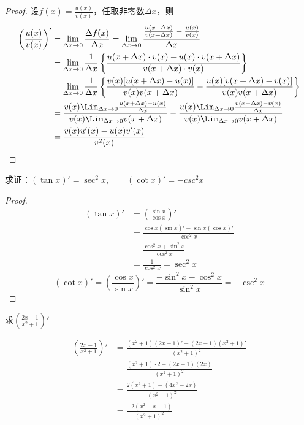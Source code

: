 \begin{proof}
    设$f(x)=\frac{u(x)}{v(x)}$，任取非零数$\Delta x$，则
\begin{align*}
    \left(\frac{u(x)}{v(x)}\right)'&=\lim_{\Delta x\to 0}\frac{\Delta f(x)}{\Delta x}=\lim_{\Delta x\to 0}\frac{\frac{u(x+\Delta x)}{v(x+\Delta x)}-\frac{u(x)}{v(x)}}{\Delta x}\\
    &=\lim_{\Delta x\to 0}\frac{1}{\Delta x}\left\{\frac{u(x+\Delta x)\cdot v(x)-u(x)\cdot v(x+\Delta x)}{v(x+\Delta x)\cdot v(x)}\right\}\\
    &=\lim_{\Delta x\to 0}\frac{1}{\Delta x}\left\{\frac{v(x)[u(x+\Delta x)-u(x)]}{v(x)v(x+\Delta x)}-\frac{u(x)[v(x+\Delta x)-v(x)]}{v(x)v(x+\Delta x)}\right\}\\
    &=\frac{v(x)\Lim_{\Delta x\to 0}\frac{u(x+\Delta x)-u(x)}{\Delta x}}{v(x)\Lim_{\Delta x\to 0}v(x+\Delta x)}-\frac{u(x)\Lim_{\Delta x\to 0}\frac{v(x+\Delta x)-v(x)}{\Delta x}}{v(x)\Lim_{\Delta x\to 0}v(x+\Delta x)}\\
    &=\frac{v(x) u'(x)-u(x) v'(x)}{v^2(x)}
\end{align*}
\end{proof}


\begin{example}
求证：$(\tan x)'=\sec^2 x,\qquad (\cot x)'=-csc^2 x$
\end{example}

\begin{proof}    
\begin{align*}
    (\tan x)'&=\left(\frac{\sin x}{\cos x}\right)'\\
    &=\frac{\cos x(\sin x)'-\sin x(\cos x)'}{\cos^2 x}\\
    &=\frac{\cos^2 x+\sin^2 x}{\cos^2x}\\
    &=\frac{1}{\cos^2 x}=\sec^2 x
\end{align*}
\[(\cot x)'=\left(\frac{\cos x}{\sin x}\right)'=\frac{-\sin^2 x-\cos^2 x}{\sin^2 x}=-\csc^2 x\]    
\end{proof}

\begin{example}
    求$\left(\frac{2x-1}{x^2+1}\right)'$
\end{example}

\begin{solution}
\begin{align*}
    \left(\frac{2x-1}{x^2+1}\right)'&=\frac{(x^2+1)(2x-1)'-(2x-1)(x^2+1)'}{(x^2+1)^2}\\
&=\frac{(x^2+1)\cdot 2-(2x-1)(2x)}{(x^2+1)^2}\\
&=\frac{2(x^2+1)-(4x^2-2x)}{(x^2+1)^2}\\
&=\frac{-2(x^2-x-1)}{(x^2+1)^2}
\end{align*}
\end{solution}

